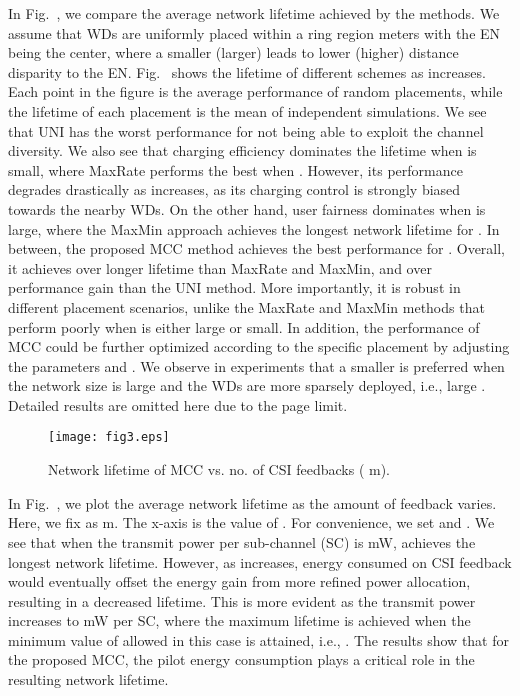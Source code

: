 \documentclass[conference]{IEEEtran}
\begin{document}
In Fig.~, we compare the average network lifetime achieved by the  methods. We assume that  WDs are uniformly placed within a ring region  meters with the EN being the center, where a smaller (larger)  leads to lower (higher) distance disparity to the EN. Fig.~ shows the lifetime of different schemes as  increases. Each point in the figure is the average performance of  random placements, while the lifetime of each placement is the mean of  independent simulations. We see that UNI has the worst performance for not being able to exploit the channel diversity. We also see that charging efficiency dominates the lifetime when  is small, where MaxRate performs the best when . However, its performance degrades drastically as  increases, as its charging control is strongly biased towards the nearby WDs. On the other hand, user fairness dominates when  is large, where the MaxMin approach achieves the longest network lifetime for . In between, the proposed MCC method achieves the best performance for . Overall, it achieves over  longer lifetime than MaxRate and MaxMin, and over  performance gain than the UNI method. More importantly, it is robust in different placement scenarios, unlike the MaxRate and MaxMin methods that perform poorly when  is either large or small. In addition, the performance of MCC could be further optimized according to the specific placement by adjusting the parameters  and . We observe in experiments that a smaller  is preferred when the network size is large and the WDs are more sparsely deployed, i.e., large . Detailed results are omitted here due to the page limit.

\begin{figure}
\centering
  \begin{center}
    \texttt{[image: fig3.eps]}
  \end{center}
  \caption{Network lifetime of MCC vs. no. of CSI feedbacks ( m).}
  \label{13}
\end{figure}

In Fig.~, we plot the average network lifetime as the amount of feedback varies. Here, we fix  as m. The x-axis is the value of . For convenience, we set  and . We see that when the transmit power per sub-channel (SC) is  mW,   achieves the longest network lifetime. However, as  increases, energy consumed on CSI feedback would eventually offset the energy gain from more refined power allocation, resulting in a decreased lifetime. This is more evident as the transmit power increases to  mW per SC, where the maximum lifetime is achieved when the minimum value of  allowed in this case is attained, i.e., . The results show that for the proposed MCC, the pilot energy consumption plays a critical role in the resulting network lifetime.
\end{document}
